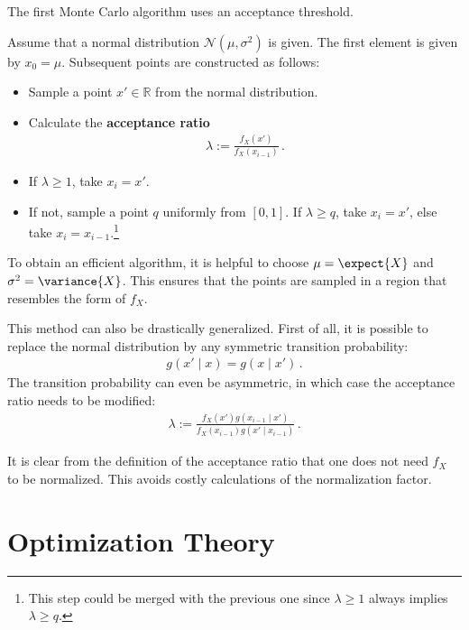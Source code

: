     The first Monte Carlo algorithm uses an acceptance threshold.
    \begin{method}
        Assume that a normal distribution $\mathcal{N}(\mu,\sigma^2)$ is given. The first element is given by $x_0=\mu$. Subsequent points are constructed as follows:
        \begin{itemize}
            \item Sample a point $x'\in\mathbb{R}$ from the normal distribution.
            \item Calculate the \textbf{acceptance ratio}
            \begin{gather}
                \lambda := \frac{f_X(x')}{f_X(x_{i-1})}\,.
            \end{gather}
            \item If $\lambda\geq1$, take $x_i=x'$.
            \item If not, sample a point $q$ uniformly from $[0,1]$. If $\lambda\geq q$, take $x_i=x'$, else take $x_i=x_{i-1}$.\footnote{This step could be merged with the previous one since $\lambda\geq1$ always implies $\lambda\geq q$.}
        \end{itemize}
        To obtain an efficient algorithm, it is helpful to choose $\mu=\expect{X}$ and $\sigma^2=\variance{X}$. This ensures that the points are sampled in a region that resembles the form of $f_X$.

        This method can also be drastically generalized. First of all, it is possible to replace the normal distribution by any symmetric transition probability:
        \begin{gather}
            g(x'\mid x) = g(x\mid x')\,.
        \end{gather}
        The transition probability can even be asymmetric, in which case the acceptance ratio needs to be modified:
        \begin{gather}
            \lambda := \frac{f_X(x')g(x_{i-1}\mid x')}{f_X(x_{i-1})g(x'\mid x_{i-1})}\,.
        \end{gather}
    \end{method}
    \begin{remark}[Normalization]
        It is clear from the definition of the acceptance ratio that one does not need $f_X$ to be normalized. This avoids costly calculations of the normalization factor.
    \end{remark}

\section{Optimization Theory}
